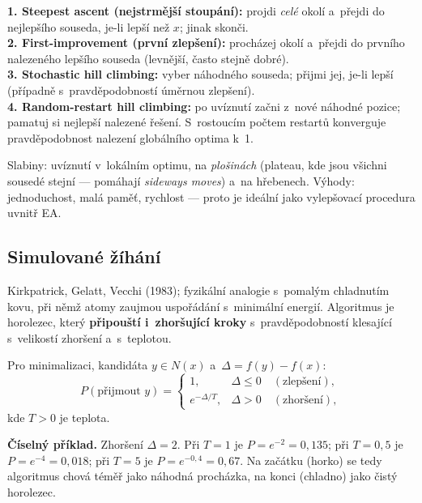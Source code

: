 \documentclass[11pt,a4paper]{article}
\theoremstyle{definition}
\begin{document}
\begin{defbox}
\textbf{1. Steepest ascent (nejstrmější stoupání):} projdi \emph{celé} okolí
a~přejdi do nejlepšího souseda, je-li lepší než $x$; jinak skonči.\\
\textbf{2. First-improvement (první zlepšení):} procházej okolí a~přejdi do
prvního nalezeného lepšího souseda (levnější, často stejně dobré).\\
\textbf{3. Stochastic hill climbing:} vyber náhodného souseda; přijmi jej,
je-li lepší (případně s~pravděpodobností úměrnou zlepšení).\\
\textbf{4. Random-restart hill climbing:} po uvíznutí začni z~nové náhodné
pozice; pamatuj si nejlepší nalezené řešení. S~rostoucím počtem restartů
konverguje pravděpodobnost nalezení globálního optima k~1.
\end{defbox}

Slabiny: uvíznutí v~lokálním optimu, na \emph{plošinách} (plateau, kde jsou
všichni sousedé stejní --- pomáhají \emph{sideways moves}) a~na hřebenech.
Výhody: jednoduchost, malá paměť, rychlost --- proto je ideální jako
vylepšovací procedura uvnitř EA.

\subsection{Simulované žíhání}

\begin{defbox}
Kirkpatrick, Gelatt, Vecchi (1983); fyzikální analogie s~pomalým chladnutím
kovu, při němž atomy zaujmou uspořádání s~minimální energií. Algoritmus je
horolezec, který \textbf{připouští i~zhoršující kroky} s~pravděpodobností
klesající s~velikostí zhoršení a~s~teplotou.
\end{defbox}

\begin{defbox}
Pro minimalizaci, kandidáta $y \in N(x)$ a~$\Delta = f(y) - f(x)$:
\[
P(\text{přijmout } y) =
\begin{cases}
1, & \Delta \le 0 \quad (\text{zlepšení}),\\[2pt]
e^{-\Delta / T}, & \Delta > 0 \quad (\text{zhoršení}),
\end{cases}
\]
kde $T > 0$ je teplota.
\end{defbox}

\textbf{Číselný příklad.} Zhoršení $\Delta = 2$. Při $T = 1$ je
$P = e^{-2} = 0{,}135$; při $T = 0{,}5$ je $P = e^{-4} = 0{,}018$;
při $T = 5$ je $P = e^{-0{,}4} = 0{,}67$. Na začátku (horko) se tedy algoritmus
chová téměř jako náhodná procházka, na konci (chladno) jako čistý horolezec.
\end{document}
